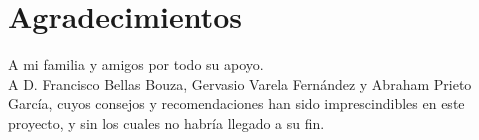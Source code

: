 \thispagestyle{empty}
\section*{Agradecimientos}

A mi familia y amigos por todo su apoyo.\\

A D. Francisco Bellas Bouza, Gervasio Varela Fernández y Abraham Prieto García, cuyos consejos y recomendaciones han sido imprescindibles en este proyecto, y sin los cuales no habría llegado a su fin.   



